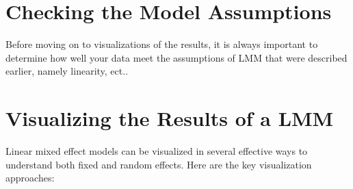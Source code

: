 \section{Checking the Model Assumptions}
Before moving on to visualizations of the results, it is always important to determine how well your data meet the assumptions of LMM that were described earlier, namely linearity, ect..


\section{Visualizing the Results of a LMM}
Linear mixed effect models can be visualized in several effective ways to understand both fixed and random effects. Here are the key visualization approaches:
\printglossary[type=datacollection,style=twocolumn]
\newpage

\renewcommand{\bibname}{References}


